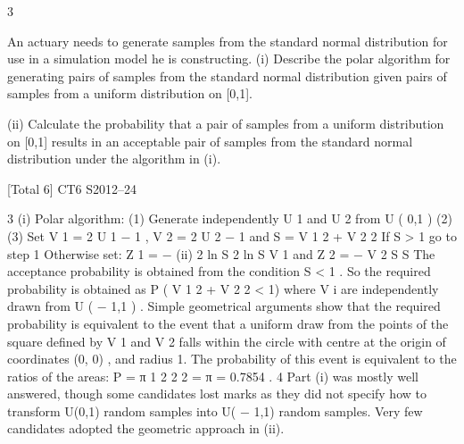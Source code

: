 \documentclass[a4paper,12pt]{article}
\begin{document}
3

An actuary needs to generate samples from the standard normal distribution for use in
a simulation model he is constructing.
(i) Describe the polar algorithm for generating pairs of samples from the standard
normal distribution given pairs of samples from a uniform distribution on
[0,1].

(ii) Calculate the probability that a pair of samples from a uniform distribution on
[0,1] results in an acceptable pair of samples from the standard normal
distribution under the algorithm in (i).

[Total 6]
CT6 S2012–24


3
(i)
Polar algorithm:
(1) Generate independently U 1 and U 2 from U ( 0,1 )
(2)
(3) Set V 1 = 2 U 1 − 1 , V 2 = 2 U 2 − 1 and S = V 1 2 + V 2 2
If S > 1 go to step 1
Otherwise set:
Z 1 = −
(ii)
2 ln S
2 ln S
V 1 and Z 2 = −
V 2
S
S
The acceptance probability is obtained from the condition S < 1 . So the
required probability is obtained as P ( V 1 2 + V 2 2 < 1) where V i are independently
drawn from U ( − 1,1 ) .
Simple geometrical arguments show that the required probability is equivalent
to the event that a uniform draw from the points of the square defined by
V 1 \in  [ − 1,1] and V 2 \in  [ − 1,1] falls within the circle with centre at the origin of
coordinates (0, 0) , and radius 1.
The probability of this event is equivalent to the ratios of the areas:
P =
π 1 2
2
2
=
π
= 0.7854 .
4
Part (i) was mostly well answered, though some candidates lost marks as they did not specify
how to transform U(0,1) random samples into U( − 1,1) random samples. Very few candidates
adopted the geometric approach in (ii).
\end{document}
